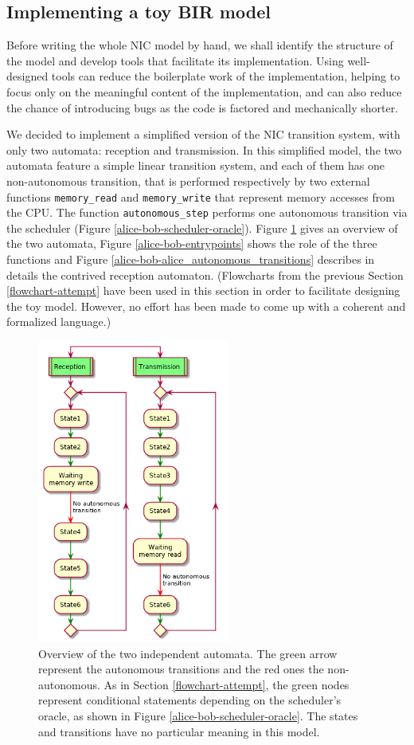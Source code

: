 \documentclass{kththesis}
\begin{document}
{\subsection{Implementing a toy BIR model} \label{alice-bob-toy}

Before writing the whole NIC model by hand, we shall identify the structure of the model and develop tools that facilitate its implementation. Using well-designed tools can reduce the boilerplate work of the implementation, helping to focus only on the meaningful content of the implementation, and can also reduce the chance of introducing bugs as the code is factored and mechanically shorter.

We decided to implement a simplified version of the NIC transition system, with only two automata: reception and transmission. In this simplified model, the two automata feature a simple linear transition system, and each of them has one non-autonomous transition, that is performed respectively by two external functions \texttt{memory\_read} and \texttt{memory\_write} that represent memory accesses from the CPU. The function \texttt{autonomous\_step} performs one autonomous transition via the scheduler (Figure \ref{alice-bob-scheduler-oracle}). Figure \ref{alice-bob-automata-overview} gives an overview of the two automata, Figure \ref{alice-bob-entrypoints} shows the role of the three functions and Figure \ref{alice-bob-alice_autonomous_transitions} describes in details the contrived reception automaton. (Flowcharts from the previous Section \ref{flowchart-attempt} have been used in this section in order to facilitate designing the toy model. However, no effort has been made to come up with a coherent and formalized language.)

\begin{figure}[p]
	\includegraphics[height=10cm]{figures/alice-bob-automata-overview.png}
	\centering
	\caption{Overview of the two independent automata. The green arrow represent the autonomous transitions and the red ones the non-autonomous. As in Section \ref{flowchart-attempt}, the green nodes represent conditional statements depending on the scheduler's oracle, as shown in Figure \ref{alice-bob-scheduler-oracle}. The states and transitions have no particular meaning in this model.}
	\label{alice-bob-automata-overview}
\end{figure}

}
\end{document}
